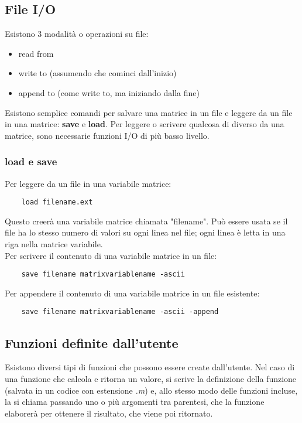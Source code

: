 \documentclass[a4paper, 10pt]{article}
\begin{document}
\subsection{File I/O}
Esistono 3 modalità o operazioni su file:
\begin{itemize}
\item read from
\item write to (assumendo che cominci dall'inizio)
\item append to (come write to, ma iniziando dalla fine)
\end{itemize} 
Esistono semplice comandi per salvare una matrice in un file e leggere da un file in una matrice: \textbf{save} e \textbf{load}.
Per leggere o scrivere qualcosa di diverso da una matrice, sono necessarie funzioni I/O di più basso livello.

\subsubsection{load e save}
Per leggere da un file in una variabile matrice:
\begin{lstlisting} 
	load filename.ext
\end{lstlisting}
Questo creerà una variabile matrice chiamata "filename". Può essere usata se il file ha lo stesso numero di valori su ogni linea nel file; ogni linea è letta in una riga nella matrice variabile.\\
Per scrivere il contenuto di una variabile matrice in un file:
\begin{lstlisting}
	save filename matrixvariablename -ascii
\end{lstlisting}
Per appendere il contenuto di una variabile matrice in un file esistente:
\begin{lstlisting}
	save filename matrixvariablename -ascii -append
\end{lstlisting}

\subsection{Funzioni definite dall'utente}
Esistono diversi tipi di funzioni che possono essere create dall'utente. Nel caso di una funzione che calcola e ritorna un valore, si scrive la definizione della funzione (salvata in un codice con estensione \textit{.m}) e, allo stesso modo delle funzioni incluse, la si chiama passando uno o più argomenti tra parentesi, che la funzione elaborerà per ottenere il risultato, che viene poi ritornato.
\end{document}
